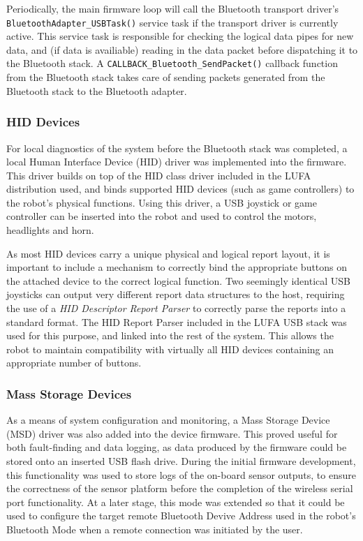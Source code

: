 Periodically, the main firmware loop will call the Bluetooth transport driver's \\ \lstinline{BluetoothAdapter_USBTask()} service task if the transport driver is currently active. This service task is responsible for checking the logical data pipes for new data, and (if data is availiable) reading in the data packet before dispatching it to the Bluetooth stack. A \lstinline{CALLBACK_Bluetooth_SendPacket()} callback function from the Bluetooth stack takes care of sending packets generated from the Bluetooth stack to the Bluetooth adapter.

\FloatBarrier
\subsubsection{HID Devices}

For local diagnostics of the system before the Bluetooth stack was completed, a local Human Interface Device (HID) driver was implemented into the firmware. This driver builds on top of the HID class driver included in the LUFA distribution used, and binds supported HID devices (such as game controllers) to the robot's physical functions. Using this driver, a USB joystick or game controller can be inserted into the robot and used to control the motors, headlights and horn.

As most HID devices carry a unique physical and logical report layout, it is important to include a mechanism to correctly bind the appropriate buttons on the attached device to the correct logical function. Two seemingly identical USB joysticks can output very different report data structures to the host, requiring the use of a \textit{HID Descriptor Report Parser} to correctly parse the reports into a standard format. The HID Report Parser included in the LUFA USB stack was used for this purpose, and linked into the rest of the system. This allows the robot to maintain compatibility with virtually all HID devices containing an appropriate number of buttons.

\FloatBarrier
\subsubsection{Mass Storage Devices}

As a means of system configuration and monitoring, a Mass Storage Device (MSD) driver was also added into the device firmware. This proved useful for both fault-finding and data logging, as data produced by the firmware could be stored onto an inserted USB flash drive. During the initial firmware development, this functionality was used to store logs of the on-board sensor outputs, to ensure the correctness of the sensor platform before the completion of the wireless serial port functionality. At a later stage, this mode was extended so that it could be used to configure the target remote Bluetooth Devive Address used in the robot's Bluetooth Mode when a remote connection was initiated by the user.

